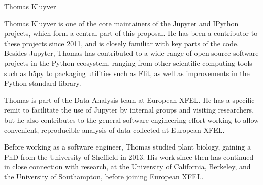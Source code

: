 \begin{participant}[type=R,PM=1,gender=male]{Thomas Kluyver}

  Thomas Kluyver is one of the core maintainers of the Jupyter and IPython
  projects, which form a central part of this proposal.
  He has been a contributor to these projects since 2011,
  and is closely familiar with key parts of the code.
  Besides Jupyter, Thomas has contributed to a wide range of open source
  software projects in the Python ecosystem, ranging from other scientific
  computing tools such as h5py to packaging utilities such as Flit, as well
  as improvements in the Python standard library.
  
  Thomas is part of the Data Analysis team at European XFEL.
  He has a specific remit to facilitate the use of Jupyter by internal groups
  and visiting researchers,
  but he also contributes to the general software engineering effort working to
  allow convenient, reproducible analysis of data collected at European XFEL.

  Before working as a software engineer, Thomas studied plant biology, gaining
  a PhD from the University of Sheffield in 2013. His work since then has
  continued in close connection with research, at the University of California,
  Berkeley, and the University of Southampton, before joining European XFEL.
\end{participant}

